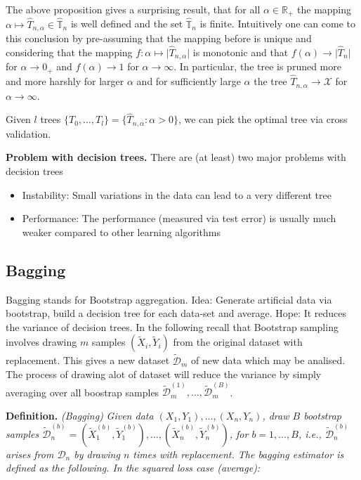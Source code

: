 \documentclass[a4paper,10pt,openany]{book}
\providecommand{\tightlist}{%
 \setlength{\itemsep}{0pt}\setlength{\parskip}{0pt}}
\begin{document}
The above proposition gives a surprising result, that for all \(\alpha\in \mathbb R_+\) the mapping \(\alpha \mapsto\hat T_{n,\alpha}\in\hat{ \mathbb T}_n\) is well defined and the set \(\hat{ \mathbb T}_n\) is finite. Intuitively one can come to this conclusion by pre-assuming that the mapping before is unique and considering that the mapping \(f : \alpha \mapsto \vert \hat T_{n,\alpha}\vert\) is monotonic and that \(f(\alpha)\to \vert \hat T_n\vert\) for \(\alpha \to 0_+\) and \(f(\alpha)\to 1\) for \(\alpha \to \infty\). In particular, the tree is pruned more and more harshly for larger \(\alpha\) and for sufficiently large \(\alpha\) the tree \(\hat T_{n,\alpha}\to\mathcal X\) for \(\alpha \to \infty\).

Given \(l\) trees \(\{T_0,\dots, T_l\}=\{\hat T_{n,\alpha} : \alpha>0\}\), we can pick the optimal tree via cross validation.

\textbf{Problem with decision trees.} There are (at least) two major problems with decision trees

\begin{itemize}
\tightlist
\item
  Instability: Small variations in the data can lead to a very different tree
\item
  Performance: The performance (measured via test error) is usually much weaker compared to other learning algorithms
\end{itemize}

\hypertarget{bagging}{%
\subsection{Bagging}\label{bagging}}

Bagging stands for Bootstrap aggregation. Idea: Generate artificial data via bootstrap, build a decision tree for each data-set and average. Hope: It reduces the variance of decision trees. In the following recall that Bootstrap sampling involves drawing \(m\) samples \((\tilde X_i,\tilde Y_i)\) from the original dataset with replacement. This gives a new dataset \(\tilde {\mathcal D}_m\) of new data which may be analised. The process of drawing alot of dataset will reduce the variance by simply averaging over all boostrap samples \(\tilde {\mathcal D}_m^{(1)},...,\tilde {\mathcal D}_m^{(B)}\).

\textbf{Definition.} \emph{(Bagging)} \emph{Given data \({(X_1,Y_1),\dots, (X_n,Y_n)}\), draw \(B\) bootstrap samples \(\tilde {\mathcal D}^{(b)}_n={(\tilde X^{(b)}_1,\tilde Y^{(b)}_1),\dots, (\tilde X^{(b)}_n,\tilde Y^{(b)}_n)}\), for \(b=1,\dots, B\), i.e., \(\tilde {\mathcal D}^{(b)}_n\) arises from \(\mathcal D_n\) by drawing \(n\) times with replacement. The bagging estimator is defined as the following. In the squared loss case (average):}
\end{document}
